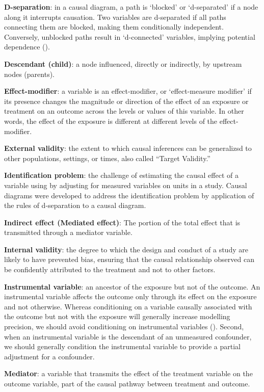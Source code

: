 \documentclass[
  singlecolumn]{article}
\begin{document}
\textbf{D-separation}: in a causal diagram, a path is `blocked' or
`d-separated' if a node along it interrupts causation. Two variables are
d-separated if all paths connecting them are blocked, making them
conditionally independent. Conversely, unblocked paths result in
`d-connected' variables, implying potential dependence
().

\textbf{Descendant (child)}: a node influenced, directly or indirectly,
by upstream nodes (parents).

\textbf{Effect-modifier}: a variable is an effect-modifier, or
`effect-measure modifier' if its presence changes the magnitude or
direction of the effect of an exposure or treatment on an outcome across
the levels or values of this variable. In other words, the effect of the
exposure is different at different levels of the effect-modifier.

\textbf{External validity}: the extent to which causal inferences can be
generalizsd to other populations, settings, or times, also called
``Target Validity.''

\textbf{Identification problem}: the challenge of estimating the causal
effect of a variable using by adjusting for measured variables on units
in a study. Causal diagrams were developed to address the identification
problem by application of the rules of d-separation to a causal diagram.

\textbf{Indirect effect (Mediated effect)}: The portion of the total
effect that is transmitted through a mediator variable.

\textbf{Internal validity}: the degree to which the design and conduct
of a study are likely to have prevented bias, ensuring that the causal
relationship observed can be confidently attributed to the treatment and
not to other factors.

\textbf{Instrumental variable}: an ancestor of the exposure but not of
the outcome. An instrumental variable affects the outcome only through
its effect on the exposure and not otherwise. Whereas conditioning on a
variable causally associated with the outcome but not with the exposure
will generally increase modelling precision, we should avoid
conditioning on instrumental variables
(). Second, when
an instrumental variable is the descendant of an unmeasured confounder,
we should generally condition the instrumental variable to provide a
partial adjustment for a confounder.

\textbf{Mediator}: a variable that transmits the effect of the treatment
variable on the outcome variable, part of the causal pathway between
treatment and outcome.
\end{document}
